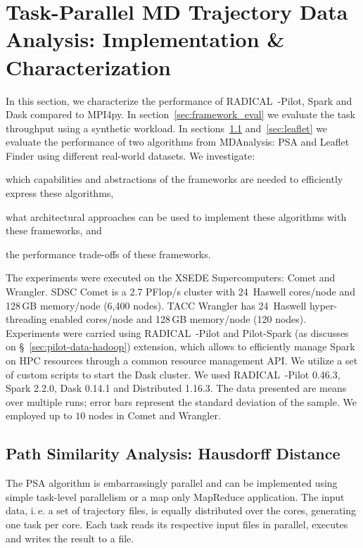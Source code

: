 \section{Task-Parallel MD Trajectory Data Analysis: Implementation \& Characterization}
\label{impl_exp}
In this section, we characterize the performance of RADICAL~-Pilot, Spark and Dask compared to MPI4py.
In section~\ref{sec:framework_eval} we evaluate the task throughput using a synthetic workload.
In sections~\ref{sec:psa} and~\ref{sec:leaflet} we evaluate the performance of two algorithms from MDAnalysis: PSA and Leaflet Finder using different real-world datasets.
We investigate: 
\begin{inparaenum}[1)]
    \item which capabilities and abstractions of the frameworks are needed to efficiently express these algorithms,
    \item what architectural approaches can be used to implement these algorithms with these frameworks, and
    \item the performance trade-offs of these frameworks.
\end{inparaenum}

The experiments were executed on the XSEDE Supercomputers: Comet and Wrangler.
SDSC Comet is a 2.7 PFlop/s cluster with 24\, Haswell cores/node and 128\,GB memory/node (6,400 nodes).
TACC Wrangler has 24\, Haswell hyper-threading enabled cores/node and 128\,GB memory/node (120 nodes).
Experiments were carried using RADICAL~-Pilot and Pilot-Spark (as discusses on \S~\ref{sec:pilot-data-hadoop}) extension, which allows to efficiently manage Spark on HPC resources through a common resource management API.
We utilize a set of custom scripts to start the Dask cluster.
We used RADICAL~-Pilot 0.46.3, Spark 2.2.0, Dask 0.14.1 and Distributed 1.16.3.
The data presented are means over multiple runs; error bars represent the standard deviation of the sample.
We employed up to $10$ nodes in Comet and Wrangler. 

\subsection{Path Similarity Analysis: Hausdorff Distance}
\label{sec:psa}
The PSA algorithm is embarrassingly parallel and can be implemented using simple task-level parallelism or a map only MapReduce application.
The input data, i.\,e. a set of trajectory files, is equally distributed over the cores, generating one task per core.
Each task reads its respective input files in parallel, executes and writes the result to a file.

